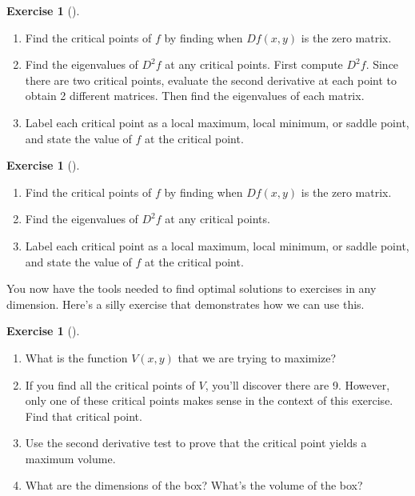 \documentclass[10pt,]{book}
\theoremstyle{plain}
\theoremstyle{definition}
\theoremstyle{definition}
\theoremstyle{definition}
\theoremstyle{definition}
\newtheorem{exploration}[project]{Exercise}
\theoremstyle{definition}
\numberwithin{equation}{section}
\begin{document}
\begin{exploration}[]\label{exploration-237}
\leavevmode%
\begin{enumerate}[font=\bfseries,label=(\alph*),ref=\alph*]
\item\label{task-633} Find the critical points of \(f\) by finding when \(Df(x,y)\) is the zero matrix.%
\item\label{task-634} Find the eigenvalues of \(D^2f\) at any critical points. First compute \(D^2f\). Since there are two critical points, evaluate the second derivative at each point to obtain 2 different matrices. Then find the eigenvalues of each matrix.%
%
\item\label{task-635} Label each critical point as a local maximum, local minimum, or saddle point, and state the value of \(f\) at the critical point.%
\end{enumerate}
\end{exploration}
\begin{exploration}[]\label{exploration-238}
\leavevmode%
\begin{enumerate}[font=\bfseries,label=(\alph*),ref=\alph*]
\item\label{task-636} Find the critical points of \(f\) by finding when \(Df(x,y)\) is the zero matrix.%
\item\label{task-637} Find the eigenvalues of \(D^2f\) at any critical points.%
\item\label{task-638} Label each critical point as a local maximum, local minimum, or saddle point, and state the value of \(f\) at the critical point.%
\end{enumerate}
\end{exploration}
You now have the tools needed to find optimal solutions to exercises in any dimension. Here's a silly exercise that demonstrates how we can use this.%
\begin{exploration}[]\label{optimize_box_in_cake}
\leavevmode%
\begin{enumerate}[font=\bfseries,label=(\alph*),ref=\alph*]
\item\label{task-639} What is the function \(V(x,y)\) that we are trying to maximize?%
\item\label{task-640} If you find all the critical points of \(V\), you'll discover there are 9.  However, only one of these critical points makes sense in the context of this exercise. Find that critical point.%
\item\label{task-641} Use the second derivative test to prove that the critical point yields a maximum volume.%
\item\label{task-642} What are the dimensions of the box? What's the volume of the box?%
\end{enumerate}
\end{exploration}
\end{document}
